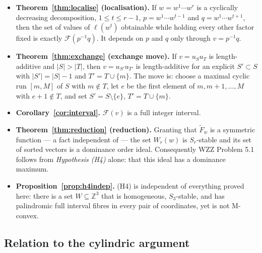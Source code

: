 \documentclass[11pt]{article}
\theoremstyle{definition}
\newcommand{\Z}{\mathbb{Z}}
\newcommand{\Fw}{\widetilde{F}_{w}}
\begin{document}
\begin{itemize}
\item \textbf{Theorem~\ref{thm:localise} (localisation).} If $w=w^1\cdots w^r$ is a cyclically
decreasing decomposition, $1\le t\le r-1$, $p=w^1\cdots w^{t-1}$ and $q=w^1\cdots w^{t+1}$,
then the set of values of $\ell(w^t)$ obtainable while holding every other factor fixed is
exactly $\mathcal F(p^{-1}q)$. It depends on $p$ and $q$ only through $v=p^{-1}q$.
\item \textbf{Theorem~\ref{thm:exchange} (exchange move).} If $v=u_Su_T$ is length-additive and
$|S|>|T|$, then $v=u_{S'}u_{T'}$ is length-additive for an explicit $S'\subset S$ with
$|S'|=|S|-1$ and $T'=T\cup\{m\}$. The move is: choose a maximal cyclic run $[m,M]$ of $S$ with
$m\notin T$, let $e$ be the first element of $m,m+1,\dots,M$ with $e+1\notin T$, and set
$S'=S\setminus\{e\}$, $T'=T\cup\{m\}$.
\item \textbf{Corollary~\ref{cor:interval}.} $\mathcal F(v)$ is a full integer interval.
\item \textbf{Theorem~\ref{thm:reduction} (reduction).} Granting that $\Fw$ is a symmetric
function \cite{Lam2006} --- a fact independent of \cite[Cor.~8.5]{Lam2008} --- the set
$W_r(w)$ is $S_r$-stable and its set of sorted vectors is a dominance order ideal. Consequently
WZZ Problem 5.1 follows from \emph{Hypothesis \textnormal{(H4)}} alone: that this ideal has a
dominance maximum.
\item \textbf{Proposition~\ref{prop:h4indep}.} (H4) is independent of everything proved here:
there is a set $W\subseteq\Z^3$ that is homogeneous, $S_3$-stable, and has palindromic full
interval fibres in every pair of coordinates, yet is not M-convex.
\end{itemize}

\subsection{Relation to the cylindric argument}
\end{document}

